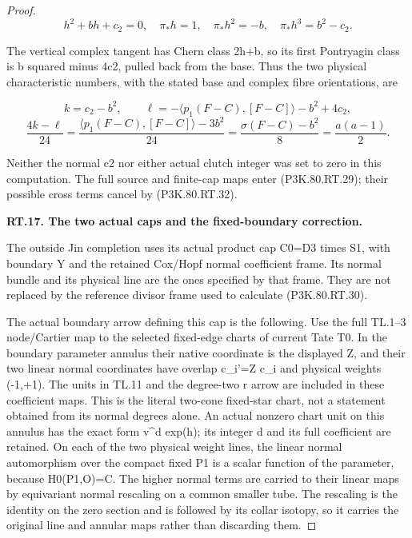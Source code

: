 \begin{proof}
\[
 h^2+b h+c_2=0,\quad \pi_*h=1,\quad
 \pi_*h^2=-b,\quad\pi_*h^3=b^2-c_2.
\]

The vertical complex tangent has Chern class 2h+b, so its first
Pontryagin class is b squared minus 4c2, pulled back from the base.
Thus the two physical characteristic numbers, with the stated
base and complex fibre orientations, are

\[
 k=c_2-b^2,\qquad
 \ell=-\langle p_1(F-C),[F-C]\rangle-b^2+4c_2,
\]
\[
 \frac{4k-\ell}{24}
 =\frac{\langle p_1(F-C),[F-C]\rangle-3b^2}{24}
 =\frac{\sigma(F-C)-b^2}{8}=\frac{a(a-1)}{2}.           \tag{P3K.80.RT.32}
\]

Neither the normal c2 nor either actual clutch integer was set to
zero in this computation. The full source and finite-cap maps
enter (P3K.80.RT.29); their possible cross terms cancel by (P3K.80.RT.32).

\par\medskip\noindent\textbf{RT.17. The two actual caps and the fixed-boundary correction.}\par\nopagebreak[4]

The outside Jin completion uses its actual product cap
C0=D3 times S1, with boundary Y and the retained Cox/Hopf normal
coefficient frame. Its normal bundle and its physical line are
the ones specified by that frame. They are not replaced by the
reference divisor frame used to calculate (P3K.80.RT.30).

The actual boundary arrow defining this cap is the following.
Use the full TL.1--3 node/Cartier map to the selected fixed-edge
charts of current Tate T0. In the boundary parameter annulus their
native coordinate is the displayed Z, and their two linear normal
coordinates have overlap c\_i'=Z c\_i and physical weights (-1,+1).
The units in TL.11 and the degree-two r arrow are included in
these coefficient maps. This is the literal two-cone fixed-star
chart, not a statement obtained from its normal degrees alone.
An actual nonzero chart unit on this annulus has the exact form
v\textasciicircum{}d exp(h); its integer d and its full coefficient are retained.
On each of the two physical weight lines, the linear normal
automorphism over the compact fixed P1 is a scalar function of
the parameter, because H0(P1,O)=C. The higher normal terms are
carried to their linear maps by equivariant normal rescaling on
a common smaller tube. The rescaling is the identity on the zero
section and is followed by its collar isotopy, so it carries the
original line and annular maps rather than discarding them.


\end{proof}
